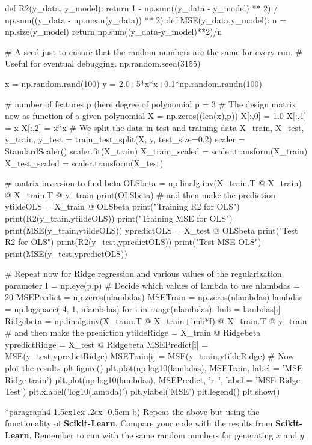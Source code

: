 \documentclass[%
oneside,                 %
final,                   %
10pt]{article}
\makeatletter
\newenvironment{doconceexercise}{}{}
\newcommand\subex{\@startsection*{paragraph}{4}{\z@}%
                  {1.5ex\@plus1ex \@minus.2ex}%
                  {-0.5em}%
                  {\normalfont\normalsize\bfseries}}
\makeatother
\begin{document}
\begin{doconceexercise}
\begin{print}
def R2(y_data, y_model):
    return 1 - np.sum((y_data - y_model) ** 2) / np.sum((y_data - np.mean(y_data)) ** 2)
def MSE(y_data,y_model):
    n = np.size(y_model)
    return np.sum((y_data-y_model)**2)/n


# A seed just to ensure that the random numbers are the same for every run.
# Useful for eventual debugging.
np.random.seed(3155)

x = np.random.rand(100)
y = 2.0+5*x*x+0.1*np.random.randn(100)

# number of features p (here degree of polynomial
p = 3
#  The design matrix now as function of a given polynomial
X = np.zeros((len(x),p))
X[:,0] = 1.0
X[:,1] = x
X[:,2] = x*x
# We split the data in test and training data
X_train, X_test, y_train, y_test = train_test_split(X, y, test_size=0.2)
scaler = StandardScaler()
scaler.fit(X_train)
X_train_scaled = scaler.transform(X_train)
X_test_scaled = scaler.transform(X_test)

# matrix inversion to find beta
OLSbeta = np.linalg.inv(X_train.T @ X_train) @ X_train.T @ y_train
print(OLSbeta)
# and then make the prediction
ytildeOLS = X_train @ OLSbeta
print("Training R2 for OLS")
print(R2(y_train,ytildeOLS))
print("Training MSE for OLS")
print(MSE(y_train,ytildeOLS))
ypredictOLS = X_test @ OLSbeta
print("Test R2 for OLS")
print(R2(y_test,ypredictOLS))
print("Test MSE OLS")
print(MSE(y_test,ypredictOLS))

# Repeat now for Ridge regression and various values of the regularization parameter
I = np.eye(p,p)
# Decide which values of lambda to use
nlambdas = 20
MSEPredict = np.zeros(nlambdas)
MSETrain = np.zeros(nlambdas)
lambdas = np.logspace(-4, 1, nlambdas)
for i in range(nlambdas):
    lmb = lambdas[i]
    Ridgebeta = np.linalg.inv(X_train.T @ X_train+lmb*I) @ X_train.T @ y_train
    # and then make the prediction
    ytildeRidge = X_train @ Ridgebeta
    ypredictRidge = X_test @ Ridgebeta
    MSEPredict[i] = MSE(y_test,ypredictRidge)
    MSETrain[i] = MSE(y_train,ytildeRidge)
# Now plot the results
plt.figure()
plt.plot(np.log10(lambdas), MSETrain, label = 'MSE Ridge train')
plt.plot(np.log10(lambdas), MSEPredict, 'r--', label = 'MSE Ridge Test')
plt.xlabel('log10(lambda)')
plt.ylabel('MSE')
plt.legend()
plt.show()
\end{print}


\subex{b)}
Repeat the above but using the functionality of \textbf{Scikit-Learn}. Compare your code with the results from \textbf{Scikit-Learn}. Remember to run with the same random numbers for generating $x$ and $y$.



\end{doconceexercise}
\end{document}
